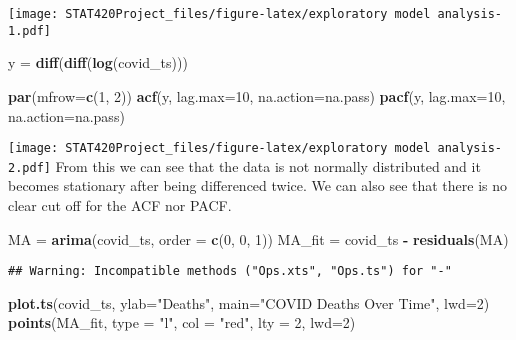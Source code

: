 \documentclass[]{article}
\newenvironment{Shaded}{\begin{snugshade}}{\end{snugshade}}
\newcommand{\DataTypeTok}[1]{\textcolor[rgb]{0.13,0.29,0.53}{#1}}
\newcommand{\DecValTok}[1]{\textcolor[rgb]{0.00,0.00,0.81}{#1}}
\newcommand{\KeywordTok}[1]{\textcolor[rgb]{0.13,0.29,0.53}{\textbf{#1}}}
\newcommand{\NormalTok}[1]{#1}
\newcommand{\OperatorTok}[1]{\textcolor[rgb]{0.81,0.36,0.00}{\textbf{#1}}}
\newcommand{\StringTok}[1]{\textcolor[rgb]{0.31,0.60,0.02}{#1}}
\begin{document}
\texttt{[image: STAT420Project\_files/figure-latex/exploratory model analysis-1.pdf]}

\begin{Shaded}
\begin{Highlighting}[]
\NormalTok{y =}\StringTok{ }\KeywordTok{diff}\NormalTok{(}\KeywordTok{diff}\NormalTok{(}\KeywordTok{log}\NormalTok{(covid_ts)))}

\KeywordTok{par}\NormalTok{(}\DataTypeTok{mfrow=}\KeywordTok{c}\NormalTok{(}\DecValTok{1}\NormalTok{, }\DecValTok{2}\NormalTok{))}
\KeywordTok{acf}\NormalTok{(y, }\DataTypeTok{lag.max=}\DecValTok{10}\NormalTok{, }\DataTypeTok{na.action=}\NormalTok{na.pass)}
\KeywordTok{pacf}\NormalTok{(y, }\DataTypeTok{lag.max=}\DecValTok{10}\NormalTok{, }\DataTypeTok{na.action=}\NormalTok{na.pass)}
\end{Highlighting}
\end{Shaded}

\texttt{[image: STAT420Project\_files/figure-latex/exploratory model analysis-2.pdf]}
From this we can see that the data is not normally distributed and it
becomes stationary after being differenced twice. We can also see that
there is no clear cut off for the ACF nor PACF.

\begin{Shaded}
\begin{Highlighting}[]
\NormalTok{MA =}\StringTok{ }\KeywordTok{arima}\NormalTok{(covid_ts, }\DataTypeTok{order =} \KeywordTok{c}\NormalTok{(}\DecValTok{0}\NormalTok{, }\DecValTok{0}\NormalTok{, }\DecValTok{1}\NormalTok{))}
\NormalTok{MA_fit =}\StringTok{ }\NormalTok{covid_ts }\OperatorTok{-}\StringTok{ }\KeywordTok{residuals}\NormalTok{(MA)}
\end{Highlighting}
\end{Shaded}

\begin{verbatim}
## Warning: Incompatible methods ("Ops.xts", "Ops.ts") for "-"
\end{verbatim}

\begin{Shaded}
\begin{Highlighting}[]
\KeywordTok{plot.ts}\NormalTok{(covid_ts, }\DataTypeTok{ylab=}\StringTok{"Deaths"}\NormalTok{, }\DataTypeTok{main=}\StringTok{"COVID Deaths Over Time"}\NormalTok{, }\DataTypeTok{lwd=}\DecValTok{2}\NormalTok{)}
\KeywordTok{points}\NormalTok{(MA_fit, }\DataTypeTok{type =} \StringTok{"l"}\NormalTok{, }\DataTypeTok{col =} \StringTok{"red"}\NormalTok{, }\DataTypeTok{lty =} \DecValTok{2}\NormalTok{, }\DataTypeTok{lwd=}\DecValTok{2}\NormalTok{)}
\end{Highlighting}
\end{Shaded}
\end{document}
